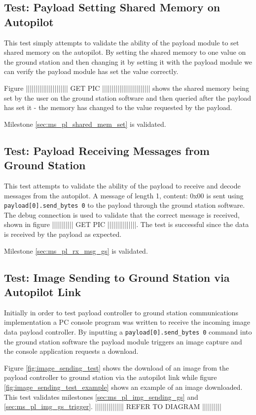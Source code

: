 \subsection{Test: Payload Setting Shared Memory on Autopilot}
\label{sec:test_pl_set_shared_mem}
This test simply attempts to validate the ability of the payload module to set shared memory on 
the autopilot. By setting the shared memory to one value on the ground station and then changing
it by setting it with the payload module we can verify the payload module has set the value correctly.

Figure |||||||||||||||||||||| GET PIC ||||||||||||||||||||||||| shows the shared memory being set by the user
on the ground station software and then queried after the payload has set it - the memory
has changed to the value requested by the payload.

Milestone \ref{sec:ms_pl_shared_mem_set} is validated.

\subsection{Test:  Payload Receiving Messages from Ground Station}
\label{sec:test_pl_receive_message}
This test attempts to validate the ability of the payload to receive and decode messages from the
autopilot. A message of length 1, content: 0x00 is sent using \verb+payload[0].send_bytes 0+ to
the payload through the ground station software. The debug connection is used to validate that the
correct message is received, shown in figure ||||||||||| GET PIC |||||||||||||||. The test is successful
since the data is received by the payload as expected.

Milestone \ref{sec:ms_pl_rx_msg_gs} is validated.

\subsection{Test: Image Sending to Ground Station via Autopilot Link}
\label{sec:test_pl_image_send}
Initially in order to test payload controller to ground station communications implementation
a PC console program was written to receive the incoming image data payload controller. By
inputting a \verb+payload[0].send_bytes 0+ command into the ground station software
the payload module triggers an image capture and the console application requests a download.

Figure \ref{fig:image_sending_test} shows the download of an image from the payload controller to
ground station via the autopilot link while figure \ref{fig:image_sending_test_example} shows an example
of an image downloaded. This test validates milestones \ref{sec:ms_pl_img_sending_gs} and \ref{sec:ms_pl_img_gs_trigger}.
||||||||||||||| REFER TO DIAGRAM ||||||||||

